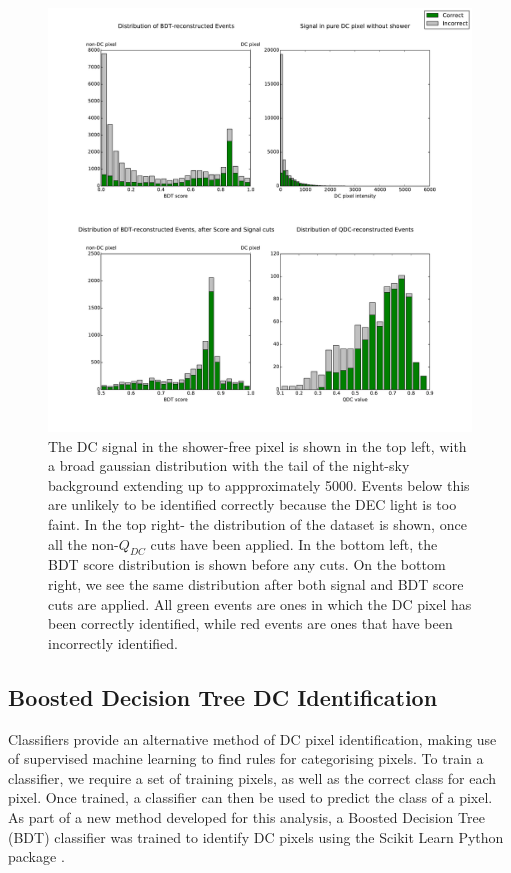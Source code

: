 \documentclass[11pt]{article}
\begin{document}
\begin{figure}
\begin{center}
\includegraphics[width=\textwidth]{hess1statsbigtestdata}
\caption{The DC signal in the shower-free pixel is shown in the top left, with a broad gaussian distribution with the tail of the night-sky background extending up to appproximately 5000. Events below this are unlikely to be identified correctly because the DEC light is too faint. In the top right- the distribution of the dataset is shown, once all the non-$Q_{DC}$ cuts have been applied. In the bottom left, the BDT score distribution is shown before any cuts. On the bottom right, we see the same distribution after both signal and BDT score cuts are applied. All green events are ones in which the DC pixel has been correctly identified, while red events are ones that have been incorrectly identified.}
\label{fig:cutdistribution}
\end{center}
\end{figure}

\subsection{Boosted Decision Tree DC Identification}
Classifiers provide an alternative method of DC pixel identification, making use of supervised machine learning to find rules for categorising pixels. To train a classifier, we require a set of training pixels, as well as the correct class for each pixel. Once trained, a classifier can then be used to predict the class of a pixel. As part of a new method developed for this analysis, a Boosted Decision Tree (BDT) classifier was trained to identify DC pixels using the Scikit Learn Python package \cite{scikit-learn}.
\end{document}
